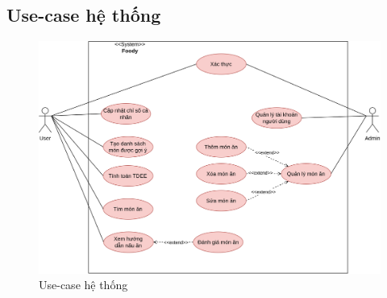 \subsection{Use-case hệ thống}
    \begin{figure}[h]
        \centering
        \includegraphics[width=1\linewidth]{images/use-case diagram/system_use-case.png}
        \caption{Use-case hệ thống}
    \end{figure}
    
